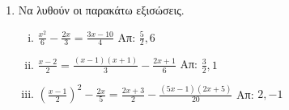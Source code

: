 \documentclass[a4paper,table]{report}
\begin{document}
\begin{enumerate}
  \item Να λυθούν οι παρακάτω εξισώσεις.
    \begin{enumerate}[i)]
      \item $ \frac{x^{2}}{6} - \frac{2x}{3} = \frac{3x-10}{4} $ \hfill Απ: $
        \frac{5}{2}, 6 $
      \item $ \frac{x-2}{2} = \frac{(x-1)(x+1)}{3} - \frac{2x+1}{6} $ \hfill Απ: $
        \frac{3}{2}, 1 $ 
      \item $ \left(\frac{x-1}{2}\right)^{2} - \frac{2x}{5} = 
        \frac{2x+3}{2} - \frac{(5x-1)(2x+5)}{20} $ \hfill Απ: $ 2, -1 $ 
    \end{enumerate}
\end{enumerate}
\end{document}

